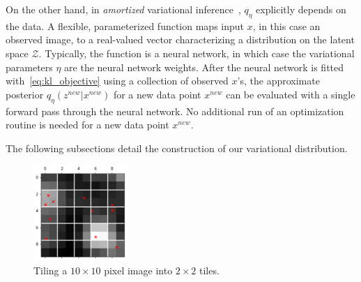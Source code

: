 
On the other hand, 
in {\itshape amortized} variational
inference~\citep{kingma2013autoencoding, rezende2014stochastic}, $q_\eta$ explicitly depends on the data. 
A flexible, parameterized function maps input $x$, in this case an observed image, to a real-valued vector characterizing a distribution on the latent space $\mathcal{Z}$. 
Typically, the function is a neural network, in which case the variational parameters $\eta$ are the neural network weights. 
After the neural network is fitted with~\eqref{eq:kl_objective} using a collection of observed $x$'s, the approximate posterior $q_\eta(z^{new} | x^{new})$ for a new data point 
$x^{new}$ can be evaluated with a single forward pass through the neural network. 
No additional run of an optimization routine is needed for a new data point $x^{new}$. 

The following subsections detail the construction of our variational distribution.

\begin{figure}
\vspace{-4em}
    \centering
    \includegraphics[width = 0.32\textwidth]{figures/vi_figures/example_tiled_less_whitespace.png}
    \caption{Tiling a $10 \times 10$ pixel image into $2 \times 2$ tiles.}
    \label{fig:ex_tiles}
    \vspace{-1em}
\end{figure}


